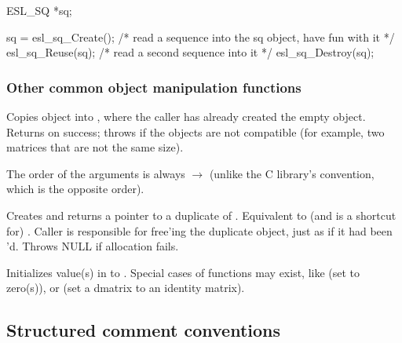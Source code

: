 \begin{sreitems}{}
\begin{cchunk}
ESL_SQ *sq;

sq = esl_sq_Create();
  /* read a sequence into the sq object, have fun with it */
esl_sq_Reuse(sq);
  /* read a second sequence into it */
esl_sq_Destroy(sq);
\end{cchunk}

\end{sreitems}

\subsubsection{Other common object manipulation functions}

\begin{sreitems}{}

\item[\ccode{\_Copy(src, dest)}]
Copies  object into , where the caller has
already created the empty  object. Returns 
on success; throws  if the objects are not
compatible (for example, two matrices that are not the same size).

The order of the arguments is always  $\rightarrow$
 (unlike the C library's  convention, which
is the opposite order).

\item[\ccode{\_Duplicate(obj)}] 

Creates and returns a pointer to a duplicate of .
Equivalent to (and is a shortcut for) . Caller is responsible for free'ing the duplicate
object, just as if it had been 'd. Throws NULL if
allocation fails.

\item[\ccode{\_Set*(obj, value...)}]

Initializes value(s) in  to . Special cases of
 functions may exist, like  (set to
zero(s)), or  (set a dmatrix to an
identity matrix).

\end{sreitems}


\subsection{Structured comment conventions}


